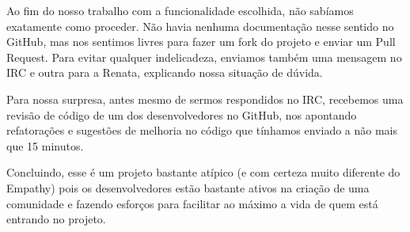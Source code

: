 Ao fim do nosso trabalho com a funcionalidade escolhida, não sabíamos exatamente
como proceder. Não havia nenhuma documentação nesse sentido no GitHub, mas nos
sentimos livres para fazer um fork do projeto e enviar um Pull Request. Para
evitar qualquer indelicadeza, enviamos também uma mensagem no IRC e outra para a
Renata, explicando nossa situação de dúvida.

Para nossa surpresa, antes mesmo de sermos respondidos no IRC, recebemos uma
revisão de código de um dos desenvolvedores no GitHub, nos apontando
refatorações e sugestões de melhoria no código que tínhamos enviado a não mais
que 15 minutos.

Concluindo, esse é um projeto bastante atípico (e com certeza muito diferente
do Empathy) pois os desenvolvedores estão bastante ativos na criação de uma
comunidade e fazendo esforços para facilitar ao máximo a vida de quem está
entrando no projeto.